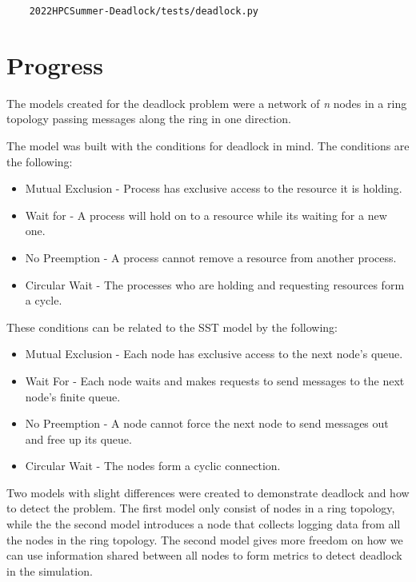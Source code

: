 \documentclass{article}
\begin{document}
\begin{verbatim}
	2022HPCSummer-Deadlock/tests/deadlock.py
\end{verbatim}

\section{Progress}
The models created for the deadlock problem were a network of \textit{n} nodes in a ring topology passing messages along the ring in one direction.

The model was built with the conditions for deadlock in mind. The conditions are the following\cite[p. 70]{1971_Coffman}:

\begin{itemize}
	\item Mutual Exclusion - Process has exclusive access to the resource it is holding.
	\item Wait for - A process will hold on to a resource while its waiting for a new one.
	\item No Preemption - A process cannot remove a resource from another process.
	\item Circular Wait - The processes who are holding and requesting resources form a cycle. \newline
\end{itemize}

These conditions can be related to the SST model by the following:

\begin{itemize}
	\item Mutual Exclusion - Each node has exclusive access to the next node's queue.
	\item Wait For - Each node waits and makes requests to send messages to the next node's finite queue.
	\item No Preemption - A node cannot force the next node to send messages out and free up its queue.
	\item Circular Wait - The nodes form a cyclic connection.
\end{itemize}

Two models with slight differences were created to demonstrate deadlock and how to detect the problem. The first model only consist of nodes in a ring topology, while the the second model introduces a node that collects logging data from all the nodes in the ring topology. The second model gives more freedom on how we can use information shared between all nodes to form metrics to detect deadlock in the simulation.
\end{document}
